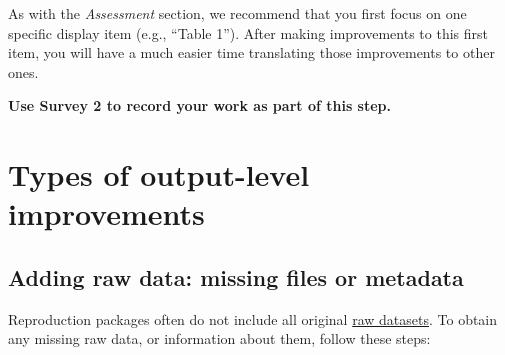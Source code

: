\documentclass[]{book}
\begin{document}
As with the \emph{Assessment} section, we recommend that you first focus on one specific display item (e.g., ``Table 1''). After making improvements to this first item, you will have a much easier time translating those improvements to other ones.

\textbf{Use Survey 2 to record your work as part of this step.}

\hypertarget{types-of-output-level-improvements}{%
\section{Types of output-level improvements}\label{types-of-output-level-improvements}}

\hypertarget{rd}{%
\subsection{Adding raw data: missing files or metadata}\label{rd}}

Reproduction packages often do not include all original \protect\hyperlink{describe-inputs}{raw datasets}. To obtain any missing raw data, or information about them, follow these steps:
\end{document}
